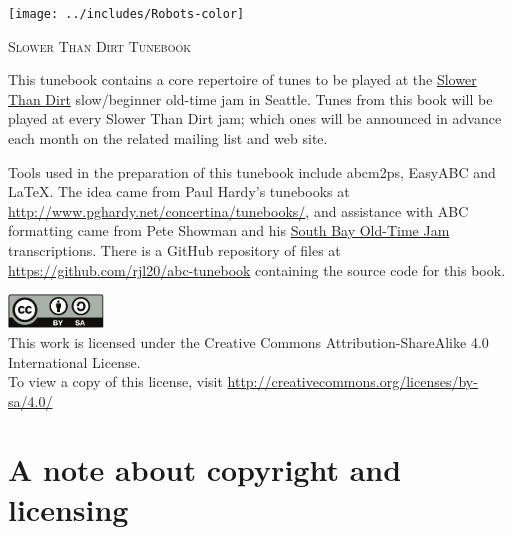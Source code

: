 \begin{titlepage}
\begin{center}

\texttt{[image: ../includes/Robots-color]}

\vspace{1cm}

\textsc{\Large Slower Than Dirt Tunebook}\\[0.5cm]


\begin{minipage}{6in}
\setlength{\parindent}{15pt} %
\setlength{\parskip}{1em plus.4em minus.3em}

This tunebook contains a core repertoire of tunes to be played at the
\href{http://slowerthandirt.org/}{Slower Than Dirt} slow/beginner
old-time jam in Seattle. Tunes from this book will be played at every
Slower Than Dirt jam; which ones will be announced in advance each
month on the related mailing list and web site.

Tools used in the preparation of this tunebook include abcm2ps,
EasyABC and {\LaTeX}. The idea came from Paul Hardy's tunebooks at
\url{http://www.pghardy.net/concertina/tunebooks/}, and assistance
with ABC formatting came from Pete Showman and his
\href{http://www.showman.org/jams/oti/}{South Bay Old-Time Jam}
transcriptions.  There is a GitHub repository of files at
\url{https://github.com/rjl20/abc-tunebook} containing the source code
for this book.

\end{minipage}

\vfill


\includegraphics[width=1in]{../includes/cc-by-sa}\\
This work is licensed under the Creative Commons
Attribution-ShareAlike 4.0 International License.\\
To view a copy of this license, visit 
\url{http://creativecommons.org/licenses/by-sa/4.0/}
\end{center}
\end{titlepage}

\clearpage


\section*{A note about copyright and licensing}

